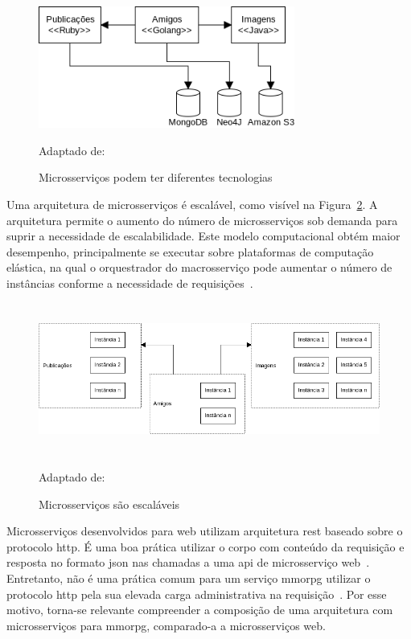 \begin{figure}[htb!]
\caption{Microsserviços podem ter diferentes tecnologias}
\label{fig:microsservicos_tecnologias}
\includegraphics[height=4cm]{img/cap2/microsservicos_tecnologias.png}
\centering

Adaptado de:~\cite{Newman2015Feb}
\end{figure}


Uma arquitetura de microsserviços é escalável, como visível na Figura~\ref{fig:microsservicos_escalabilidade}.
%
A arquitetura permite o aumento do número de microsserviços sob demanda para suprir a necessidade de escalabilidade.
%
Este modelo computacional obtém maior desempenho, principalmente se executar sobre plataformas de computação elástica, na qual o orquestrador do macrosserviço pode aumentar o número de instâncias conforme a necessidade de requisições~\cite{Nadareishvili2016Aug}.



\begin{figure}[htb!]
\caption{Microsserviços são escaláveis}
\label{fig:microsservicos_escalabilidade}
\includegraphics[height=5cm]{img/cap2/microsservicos_escalabilidade.png}
\centering

Adaptado de:~\cite{Newman2015Feb}
\end{figure}



Microsserviços desenvolvidos para web utilizam arquitetura \ac{rest} baseado sobre o protocolo \ac{http}.
%
É uma boa prática utilizar o corpo com conteúdo da requisição e resposta no formato \ac{json} nas chamadas a uma \ac{api} de microsserviço web~\cite{Nadareishvili2016Aug}.
%
Entretanto, não é uma prática comum para um serviço \ac{mmorpg} utilizar o protocolo \ac{http} pela sua elevada carga administrativa na requisição~\cite{1417630}.
%
Por esse motivo, torna-se relevante compreender a composição de uma arquitetura com microsserviços para \ac{mmorpg}, comparado-a a microsserviços web.



